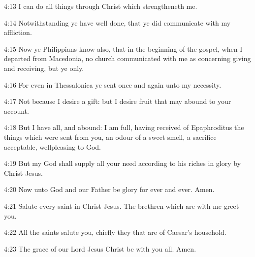 4:13 I can do all things through Christ which strengtheneth me.

4:14 Notwithstanding ye have well done, that ye did communicate with my affliction.

4:15 Now ye Philippians know also, that in the beginning of the gospel, when I departed from Macedonia, no church communicated with me as concerning giving and receiving, but ye only.

4:16 For even in Thessalonica ye sent once and again unto my necessity.

4:17 Not because I desire a gift: but I desire fruit that may abound to your account.

4:18 But I have all, and abound: I am full, having received of Epaphroditus the things which were sent from you, an odour of a sweet smell, a sacrifice acceptable, wellpleasing to God.

4:19 But my God shall supply all your need according to his riches in glory by Christ Jesus.

4:20 Now unto God and our Father be glory for ever and ever. Amen.

4:21 Salute every saint in Christ Jesus. The brethren which are with me greet you.

4:22 All the saints salute you, chiefly they that are of Caesar's household.

4:23 The grace of our Lord Jesus Christ be with you all. Amen.

